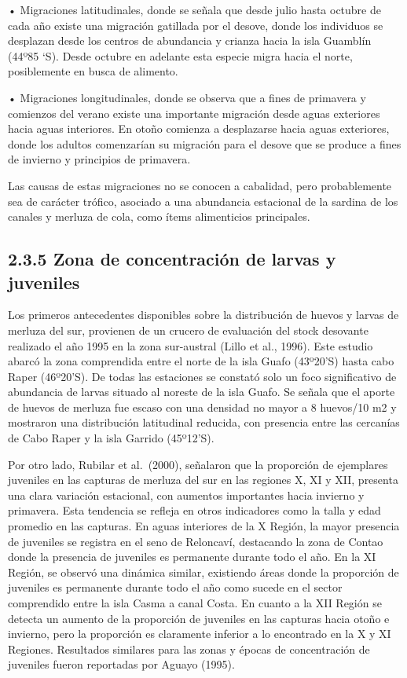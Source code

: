 \documentclass[
  spanish,
]{article}
\begin{document}
• Migraciones latitudinales, donde se señala que desde julio hasta
octubre de cada año existe una migración gatillada por el desove, donde
los individuos se desplazan desde los centros de abundancia y crianza
hacia la isla Guamblín (44º85 `S). Desde octubre en adelante esta
especie migra hacia el norte, posiblemente en busca de alimento.

• Migraciones longitudinales, donde se observa que a fines de primavera
y comienzos del verano existe una importante migración desde aguas
exteriores hacia aguas interiores. En otoño comienza a desplazarse hacia
aguas exteriores, donde los adultos comenzarían su migración para el
desove que se produce a fines de invierno y principios de primavera.

Las causas de estas migraciones no se conocen a cabalidad, pero
probablemente sea de carácter trófico, asociado a una abundancia
estacional de la sardina de los canales y merluza de cola, como ítems
alimenticios principales.

\hypertarget{zona-de-concentraciuxf3n-de-larvas-y-juveniles}{%
\subsection{2.3.5 Zona de concentración de larvas y
juveniles}\label{zona-de-concentraciuxf3n-de-larvas-y-juveniles}}

Los primeros antecedentes disponibles sobre la distribución de huevos y
larvas de merluza del sur, provienen de un crucero de evaluación del
stock desovante realizado el año 1995 en la zona sur-austral (Lillo et
al., 1996). Este estudio abarcó la zona comprendida entre el norte de la
isla Guafo (43º20'S) hasta cabo Raper (46º20'S). De todas las estaciones
se constató solo un foco significativo de abundancia de larvas situado
al noreste de la isla Guafo. Se señala que el aporte de huevos de
merluza fue escaso con una densidad no mayor a 8 huevos/10 m2 y
mostraron una distribución latitudinal reducida, con presencia entre las
cercanías de Cabo Raper y la isla Garrido (45º12'S).

Por otro lado, Rubilar et al.~(2000), señalaron que la proporción de
ejemplares juveniles en las capturas de merluza del sur en las regiones
X, XI y XII, presenta una clara variación estacional, con aumentos
importantes hacia invierno y primavera. Esta tendencia se refleja en
otros indicadores como la talla y edad promedio en las capturas. En
aguas interiores de la X Región, la mayor presencia de juveniles se
registra en el seno de Reloncaví, destacando la zona de Contao donde la
presencia de juveniles es permanente durante todo el año. En la XI
Región, se observó una dinámica similar, existiendo áreas donde la
proporción de juveniles es permanente durante todo el año como sucede en
el sector comprendido entre la isla Casma a canal Costa. En cuanto a la
XII Región se detecta un aumento de la proporción de juveniles en las
capturas hacia otoño e invierno, pero la proporción es claramente
inferior a lo encontrado en la X y XI Regiones. Resultados similares
para las zonas y épocas de concentración de juveniles fueron reportadas
por Aguayo (1995).
\end{document}
